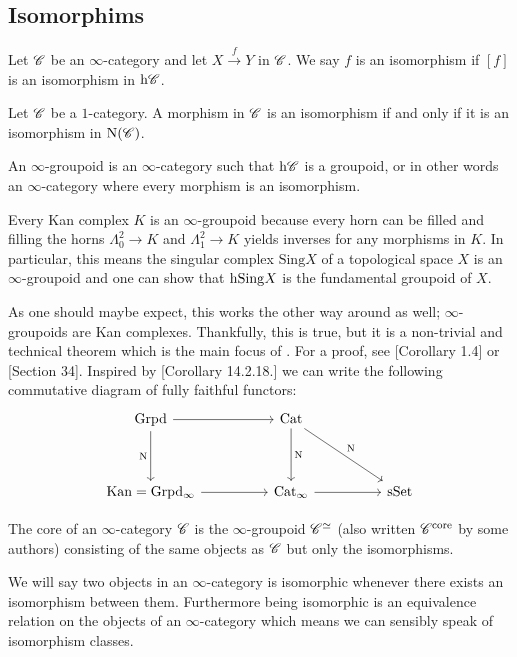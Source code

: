\documentclass[../../thesis.tex]{subfiles}
\begin{document}
\subsection{Isomorphims}
\begin{definition}
    Let $\mathscr{C}$ be an $\infty$-category and let $X\xrightarrow{f}Y$ in $\mathscr{C}$.
    We say $f$ is an isomorphism if $[f]$ is an isomorphism in $\mathrm{h}\mathscr{C}$.
\end{definition}
\begin{example}
    Let $\mathscr{C}$ be a $1$-category.
    A morphism in $\mathscr{C}$ is an isomorphism if and only if it is an isomorphism in $\mathrm{N}(\mathscr{C})$.
\end{example}
\begin{definition}
    An $\infty$-groupoid is an $\infty$-category such that $\mathrm{h}\mathscr{C}$ is a groupoid, or in other words an $\infty$-category where every morphism is an isomorphism.
\end{definition}
\begin{example}
    Every Kan complex $K$ is an $\infty$-groupoid because every horn can be filled and filling the horns $\Lambda_0^2 \to K$ and $\Lambda_1^2 \to K$ yields inverses for any morphisms in $K$.
    \newline
    In particular, this means the singular complex $\mathrm{Sing}X$ of a topological space $X$ is an $\infty$-groupoid and one can show that $\mathrm{h}\mathrm{Sing}X$ is the fundamental groupoid of $X$.
\end{example}

As one should maybe expect, this works the other way around as well; $\infty$-groupoids are Kan complexes.
Thankfully, this is true, but it is a non-trivial and technical theorem which is the main focus of \cite{Joyal}.
For a proof, see \cite{Joyal}[Corollary 1.4] or \cite{Rezk}[Section 34].
Inspired by \cite{Groth}[Corollary 14.2.18.] we can write the following commutative diagram of fully faithful functors:
\[\begin{tikzcd}
        {\mathrm{Grpd}} && {\mathrm{Cat}} \\
        \\
        {\mathrm{Kan}=\mathrm{Grpd_{\infty}}} && {\mathrm{Cat}_{\infty}} && \sset
        \arrow[from=1-1, to=1-3]
        \arrow["\Nerve"', from=1-1, to=3-1]
        \arrow[from=3-1, to=3-3]
        \arrow["\Nerve", from=1-3, to=3-3]
        \arrow[from=3-3, to=3-5]
        \arrow["\Nerve", from=1-3, to=3-5]
    \end{tikzcd}\]
\begin{definition}
    The core of an $\infty$-category $\mathscr{C}$ is the $\infty$-groupoid $\mathscr{C}^{\simeq}$ (also written $\mathscr{C}^{\text{core}}$ by some authors) consisting of the same objects as $\mathscr{C}$ but only the isomorphisms.
\end{definition}
We will say two objects in an $\infty$-category is isomorphic whenever there exists an isomorphism between them.
Furthermore being isomorphic is an equivalence relation on the objects of an $\infty$-category which means we can sensibly speak of isomorphism classes.
\end{document}
